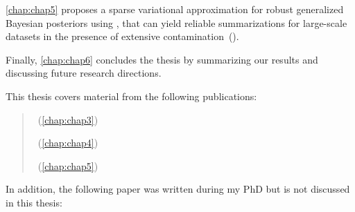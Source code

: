 \cref{chap:chap5} proposes a sparse variational approximation for robust generalized Bayesian posteriors using \bdiv, that can yield reliable summarizations for large-scale datasets in the presence of extensive contamination~(\bcores). 

Finally, \cref{chap:chap6} concludes the thesis by summarizing our results and discussing future research directions.


This thesis covers material from the following publications:

\begin{quote}
	~(\cref{chap:chap3})
	
	~(\cref{chap:chap4})
	
	~(\cref{chap:chap5})
\end{quote}


In addition, the following paper was written during my PhD but is not discussed in this thesis:

\begin{quote}
\end{quote}

